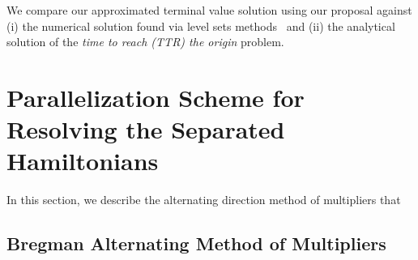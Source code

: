 We compare our approximated terminal value solution using our proposal against (i) the numerical solution found via level sets methods~\cite{LevelSetsBook}  and (ii) the analytical solution of the \textit{time to reach (TTR) the origin} problem.

\section{Parallelization Scheme for Resolving the Separated Hamiltonians}
\label{sec:admm}

In this section, we describe the alternating direction method of multipliers that 

\subsection{Bregman Alternating Method of Multipliers}
\label{sec:badmm}

